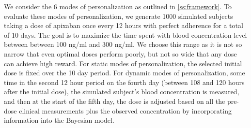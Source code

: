 
We consider the  6 modes of personalization as outlined in \cref{ss:framework}.  To evaluate these modes of personalization, we generate 1000 simulated subjects taking a dose of apixaban once every 12 hours with perfect adherence for a total of 10 days. The goal is to maximize the time spent with blood concentration level between between 100 ng/ml and 300 ng/ml. We choose this range as it is not so narrow that even optimal doses perform poorly, but not so wide that any dose can achieve high reward. For static modes of personalization, the selected initial dose is fixed over the 10 day period. For dynamic modes of personalization, some time in the second 12 hour period on the fourth day (between 108 and 120 hours after the initial dose), the simulated subject’s blood concentration is measured, and then at the start of the fifth day, the dose is adjusted based on all the pre-dose clinical measurements plus the observed concentration by incorporating information into the Bayesian model. 

